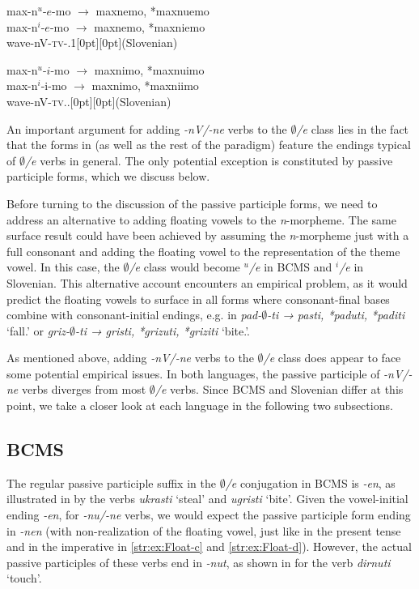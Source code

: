 \documentclass[output=paper,colorlinks,citecolor=brown]{langscibook}
\begin{document}
\ex \gll max-n$^u$-$e$-mo $→$ maxnemo, *maxnuemo \\ 
max-n$^i$-$e$-mo $→$ maxnemo, *maxniemo \\ 
\glt wave-nV-\textsc{tv}-{\PRS.1\PL}\hfill \raisebox{\baselineskip}[0pt][0pt]{(Slovenian)}\label{str:ex:Float-c}

\ex \gll max-n$^u$-$i$-mo $→$ maxnimo, *maxnuimo \\ 
max-n$^i$-i-mo $→$ maxnimo, *maxniimo \\ 
\glt wave-nV-\textsc{tv}.{.\PL}\hfill \raisebox{\baselineskip}[0pt][0pt]{(Slovenian)}\label{str:ex:Float-d}

\z
\z

\noindent An important argument for adding \textit{-nV/-ne} verbs to the \textit{$∅$/e} class lies in the fact that the forms in  (as well as the rest of the paradigm) feature the endings typical of \textit{$∅$/e} verbs in general. The only potential exception is constituted by passive participle forms, which we discuss below.

Before turning to the discussion of the passive participle forms, we need to address an alternative to adding floating vowels to the \textit{n}-morpheme. The same surface result could have been achieved by assuming the \textit{n}-morpheme just with a full consonant and adding the floating vowel to the representation of the theme vowel. In this case, the  \textit{$∅$/e} class would become \textit{$^u$/e} in BCMS and \textit{$^i$/e} in Slovenian. This alternative account encounters an empirical problem, as it would predict the floating vowels to surface in all forms where consonant-final bases combine with consonant-initial endings, e.g. in \textit{pad-$∅$-ti → pasti, *paduti, *paditi} `fall.{\INF}’ or \textit{griz-$∅$-ti → gristi, *grizuti, *griziti} `bite.{\INF}’.   

As mentioned above, adding \textit{-nV/-ne} verbs to the  \textit{$∅$/e} class does appear to face some potential empirical issues. In both languages, the passive participle of \textit{\nobreakdash-nV/\nobreakdash-ne} verbs diverges from most \textit{$∅$/e} verbs. Since BCMS and Slovenian differ at this point, we take a closer look at each language in the following two subsections.

\subsection{BCMS}

The regular passive participle suffix in the \textit{$∅$/e} conjugation in BCMS is \textit{-en}, as illustrated in  by the verbs \textit{ukrasti} `steal' and \textit{ugristi} `bite'. Given the vowel-initial ending \textit{-en}, for \textit{-nu/-ne} verbs, we would expect the passive participle form ending in \textit{-nen} (with non-realization of the floating vowel, just like in the present tense and in the imperative in \ref{str:ex:Float-c} and \ref{str:ex:Float-d}). However, the actual passive participles of these verbs end in \textit{-nut}, as shown in  for the verb \textit{dirnuti} `touch'.
\end{document}
